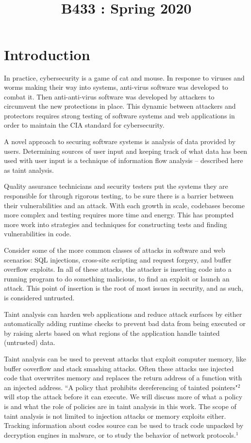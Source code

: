 \documentclass[11pt]{article}
\title{
    \vspace{2in}
    \textmd{\textbf{\tit}}\\
    \normalsize\vspace{0.1in}\small{B433 : Spring 2020 }\\
    \vspace{0.1in}\large{\textit{\auths}}
    \vspace{3in}
}
\date{}
\begin{document}
\maketitle
\pagebreak


\section*{Introduction}
In practice, cybersecurity is a game of cat and mouse. In response to viruses and worms
making their way into systems, anti-virus software was developed to combat it. Then anti-anti-virus software was developed by attackers to circumvent the new protections 
in place.  This dynamic between attackers and protectors requires strong testing 
of software systems and web applications in order to maintain the CIA standard for 
cybersecurity. 

A novel approach to securing software systems is analysis of data provided by users.
Determining sources of user input and keeping track of what data has been used with
user input is a technique of information flow analysis -- 
described here as taint analysis. 

Quality assurance technicians and security testers put the systems they are 
responsible for through rigorous testing, to be sure there is a barrier between
their vulnerabilities and an attack. 
With each growth in scale, codebases become more complex and testing requires 
more time and energy. This has prompted more work into strategies and techniques
for constructing tests and finding vulnerabilities in code.

Consider some of the more common classes of attacks in software and web scenarios: 
SQL injections, cross-site scripting and request forgery, and buffer overflow exploits. 
In all of these attacks, the attacker is inserting code into a running 
program to do something malicious, to find an exploit or launch an attack. 
This point of insertion is the root of most issues in security, and as such, is 
considered untrusted. 

Taint analysis can harden web applications and reduce attack surfaces by either 
automatically adding runtime checks to prevent bad data from being executed or
by raising alerts based on what regions of the application handle tainted (untrusted)
data. 

Taint analysis can be used to prevent attacks that exploit computer memory, 
like buffer ooverflow and stack smashing attacks. Often these attacks use injected 
code that overwrites memory and replaces the return address of a function with 
an injected address.  ``A policy that prohibits dereferencing of tainted pointers"$^2$
will stop the attack before it can execute.  We will discuss more of what a policy is
and what the role of policies are in taint analysis in this work. The scope of 
taint analysis is not limited to injection attacks or memory exploits either. 
Tracking information about codes source can be used to track code unpacked 
by decryption engines in malware, or to study the behavior of network protocols.$^1$ 
\end{document}
